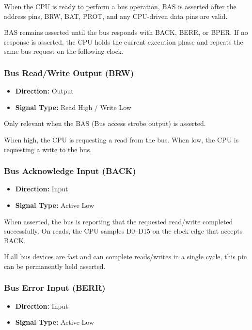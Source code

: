 When the CPU is ready to perform a bus operation, BAS is asserted after the address pins, BRW, BAT, PROT, and any
CPU-driven data pins are valid.

BAS remains asserted until the bus responds with BACK, BERR, or BPER. If no response is asserted, the CPU holds the
current execution phase and repeats the same bus request on the following clock.

\subsubsection{Bus Read/Write Output (BRW)}

\begin{itemize}
	\item \textbf{Direction:} Output
	\item \textbf{Signal Type:} Read High / Write Low
\end{itemize}

Only relevant when the BAS (Bus access strobe output) is asserted.

When high, the CPU is requesting a read from the bus. When low, the CPU is requesting a write to the bus.

\subsubsection{Bus Acknowledge Input (BACK)}

\begin{itemize}
	\item \textbf{Direction:} Input
	\item \textbf{Signal Type:} Active Low
\end{itemize}

When asserted, the bus is reporting that the requested read/write completed successfully. On reads, the CPU samples
D0--D15 on the clock edge that accepts BACK.

If all bus devices are fast and can complete reads/writes in a single cycle, this pin can be permanently held asserted.

\subsubsection{Bus Error Input (BERR)}

\begin{itemize}
	\item \textbf{Direction:} Input
	\item \textbf{Signal Type:} Active Low
\end{itemize}


